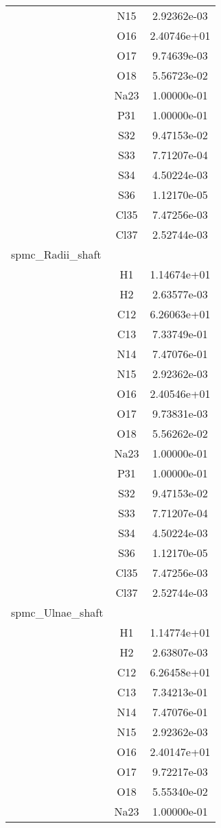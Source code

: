 \begin{centering}
\begin{longtable}{l c c}
& N15 & 2.92362e-03 \\ 
& O16 & 2.40746e+01 \\ 
& O17 & 9.74639e-03 \\ 
& O18 & 5.56723e-02 \\ 
& Na23 & 1.00000e-01 \\ 
& P31 & 1.00000e-01 \\ 
& S32 & 9.47153e-02 \\ 
& S33 & 7.71207e-04 \\ 
& S34 & 4.50224e-03 \\ 
& S36 & 1.12170e-05 \\ 
& Cl35 & 7.47256e-03 \\ 
& Cl37 & 2.52744e-03 \\ 
\hline
spmc\_Radii\_shaft & & \\
\hline
& H1 & 1.14674e+01 \\ 
& H2 & 2.63577e-03 \\ 
& C12 & 6.26063e+01 \\ 
& C13 & 7.33749e-01 \\ 
& N14 & 7.47076e-01 \\ 
& N15 & 2.92362e-03 \\ 
& O16 & 2.40546e+01 \\ 
& O17 & 9.73831e-03 \\ 
& O18 & 5.56262e-02 \\ 
& Na23 & 1.00000e-01 \\ 
& P31 & 1.00000e-01 \\ 
& S32 & 9.47153e-02 \\ 
& S33 & 7.71207e-04 \\ 
& S34 & 4.50224e-03 \\ 
& S36 & 1.12170e-05 \\ 
& Cl35 & 7.47256e-03 \\ 
& Cl37 & 2.52744e-03 \\ 
\hline
spmc\_Ulnae\_shaft & & \\
\hline
& H1 & 1.14774e+01 \\ 
& H2 & 2.63807e-03 \\ 
& C12 & 6.26458e+01 \\ 
& C13 & 7.34213e-01 \\ 
& N14 & 7.47076e-01 \\ 
& N15 & 2.92362e-03 \\ 
& O16 & 2.40147e+01 \\ 
& O17 & 9.72217e-03 \\ 
& O18 & 5.55340e-02 \\ 
& Na23 & 1.00000e-01 \\ 

\end{longtable}
\end{centering}
